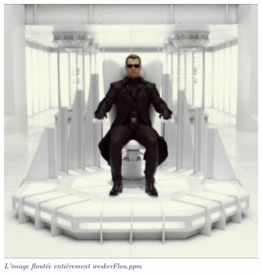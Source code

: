 \documentclass[a4paper,11pt]{article}
\begin{document}
\begin{center}
\includegraphics[scale=0.7]{weskerFlou.png}\\
\textit{L'image floutée entièrement weskerFlou.ppm}
\end{center}

\newpage
\end{document}
